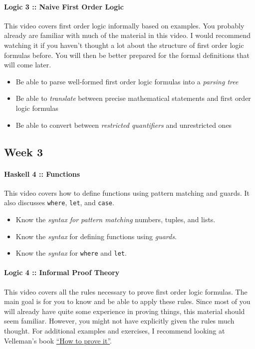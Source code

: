 \documentclass{article}[12pt]
\begin{document}
\paragraph{Logic 3 :: Naive First Order Logic} This video covers first order logic informally based on examples. You probably already are familiar with much of the material in this video. I would recommend watching it if you haven't thought a lot about the structure of first order logic formulas before. You will then be better prepared for the formal definitions that will come later.
\begin{itemize}
    \item[\twemoji{slightly smiling face}] Be able to parse well-formed first order logic formulas into a \emph{parsing tree}
    \item[\twemoji{slightly smiling face}] Be able to \emph{translate} between precise mathematical statements and first order logic formulas
    \item[\twemoji{slightly smiling face}] Be able to convert between \emph{restricted quantifiers} and unrestricted ones
\end{itemize}

\subsection*{Week 3}

\paragraph{Haskell 4 :: Functions} This video covers how to define functions using pattern matching and guards. It also discusses \texttt{where}, \texttt{let}, and \texttt{case}.
\begin{itemize}
    \item[\twemoji{slightly smiling face}] Know the \emph{syntax for pattern matching} numbers, tuples, and lists.
    \item[\twemoji{slightly smiling face}] Know the \emph{syntax} for defining functions using \emph{guards}.
    \item[\twemoji{slightly smiling face}] Know the \emph{syntax} for \texttt{where} and \texttt{let}.
\end{itemize}

\paragraph{Logic 4 :: Informal Proof Theory} This video covers all the rules necessary to prove first order logic formulas. The main goal is for you to know and be able to apply these rules. Since most of you will already have quite some experience in proving things, this material should seem familiar. However, you might not have explicitly given the rules much thought. For additional examples and exercises, I recommend looking at Velleman's book \href{https://www.cambridge.org/highereducation/books/how-to-prove-it/6D2965D625C6836CD4A785A2C843B3DA#overview}{``How to prove it''}.
\end{document}
